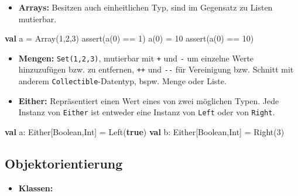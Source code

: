 \documentclass[]{article}
\newenvironment{Shaded}{}{}
\newcommand{\DecValTok}[1]{\textcolor[rgb]{0.25,0.63,0.44}{#1}}
\newcommand{\FunctionTok}[1]{\textcolor[rgb]{0.02,0.16,0.49}{#1}}
\newcommand{\KeywordTok}[1]{\textcolor[rgb]{0.00,0.44,0.13}{\textbf{#1}}}
\newcommand{\NormalTok}[1]{#1}
\providecommand{\tightlist}{%
  \setlength{\itemsep}{0pt}\setlength{\parskip}{0pt}}
\begin{document}
\begin{itemize}
\tightlist
\item
  \textbf{Arrays:} Besitzen auch einheitlichen Typ, sind im Gegensatz zu
  Listen mutierbar.
\end{itemize}

\begin{Shaded}
\begin{Highlighting}[]
\KeywordTok{val}\NormalTok{ a = Array(}\DecValTok{1}\NormalTok{,}\DecValTok{2}\NormalTok{,}\DecValTok{3}\NormalTok{)}
\FunctionTok{assert}\NormalTok{(}\FunctionTok{a}\NormalTok{(}\DecValTok{0}\NormalTok{) == }\DecValTok{1}\NormalTok{)}
\FunctionTok{a}\NormalTok{(}\DecValTok{0}\NormalTok{) = }\DecValTok{10}
\FunctionTok{assert}\NormalTok{(}\FunctionTok{a}\NormalTok{(}\DecValTok{0}\NormalTok{) == }\DecValTok{10}\NormalTok{)}
\end{Highlighting}
\end{Shaded}

\begin{itemize}
\item
  \textbf{Mengen:} \texttt{Set(1,2,3)}, mutierbar mit \texttt{+} und
  \texttt{-} um einzelne Werte hinzuzufügen bzw. zu entfernen,
  \texttt{++} und \texttt{-\/-} für Vereinigung bzw. Schnitt mit anderem
  \texttt{Collectible}-Datentyp, bspw. Menge oder Liste.
\item
  \textbf{Either:} Repräsentiert einen Wert eines von zwei möglichen
  Typen. Jede Instanz von \texttt{Either} ist entweder eine Instanz von
  \texttt{Left} oder von \texttt{Right}.
\end{itemize}

\begin{Shaded}
\begin{Highlighting}[]
\KeywordTok{val}\NormalTok{ a: Either[Boolean,Int] = }\FunctionTok{Left}\NormalTok{(}\KeywordTok{true}\NormalTok{)}
\KeywordTok{val}\NormalTok{ b: Either[Boolean,Int] = }\FunctionTok{Right}\NormalTok{(}\DecValTok{3}\NormalTok{)}
\end{Highlighting}
\end{Shaded}

\hypertarget{objektorientierung}{%
\subsection{Objektorientierung}\label{objektorientierung}}

\begin{itemize}
\tightlist
\item
  \textbf{Klassen:}
\end{itemize}
\end{document}
